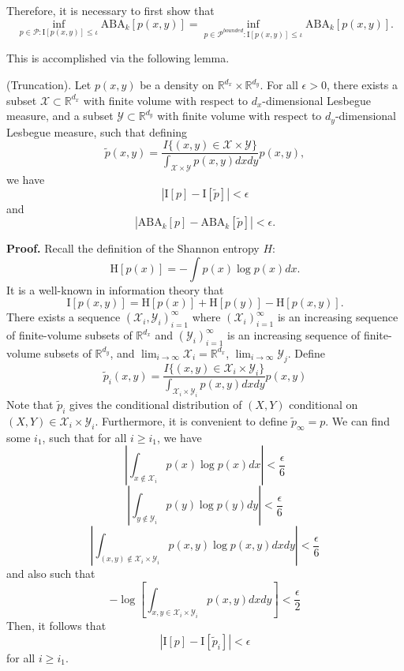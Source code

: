 \documentclass[12pt]{article}
\begin{document}
Therefore, it is necessary to first show that
\[
\inf_{p \in \mathcal{P}: \text{I}[p(x,y)] \leq \iota} \text{ABA}_k[p(x,y)] = 
\inf_{p \in \mathcal{P}^{bounded}: \text{I}[p(x,y)] \leq \iota} \text{ABA}_k[p(x,y)].
\]

This is accomplished via the following lemma.

\begin{lemma}\label{lemma:truncation} (Truncation).
Let $p(x, y)$ be a density on
$\mathbb{R}^{d_x} \times \mathbb{R}^{d_y}$.  For all $\epsilon > 0$,
there exists a subset $\mathcal{X} \subset \mathbb{R}^{d_x}$ with
finite volume with respect to $d_x$-dimensional Lesbegue measure, and
a subset $\mathcal{Y} \subset \mathbb{R}^{d_y}$ with finite volume
with respect to $d_y$-dimensional Lesbegue measure, such that defining
\[
\tilde{p}(x, y) = \frac{I\{(x,y) \in \mathcal{X}\times \mathcal{Y}\} }{\int_{\mathcal{X} \times \mathcal{Y}} p(x,y) dx dy} p(x,y),
\]
we have
\[
|\text{I}[p] - \text{I}[\tilde{p}]| < \epsilon
\]
and
\[
|\text{ABA}_k[p] - \text{ABA}_k[\tilde{p}]| < \epsilon.
\]
\end{lemma}

\textbf{Proof.}
Recall the definition of the Shannon entropy $H$:
\[
\text{H}[p(x)] = - \int p(x) \log p(x) dx.
\]
It is a well-known in information theory that
\[
\text{I}[p(x, y)] = \text{H}[p(x)] + \text{H}[p(y)] - \text{H}[p(x, y)].
\]
There exists a sequence $(\mathcal{X}_i, \mathcal{Y}_i)_{i=1}^\infty$
where $(\mathcal{X}_i)_{i=1}^\infty$ is an increasing sequence of finite-volume subsets of $\mathbb{R}^{d_x}$
and $(\mathcal{Y}_i)_{i=1}^\infty$ is an increasing sequence of finite-volume subsets of $\mathbb{R}^{d_y}$,
and $\lim_{i \to \infty} \mathcal{X}_i = \mathbb{R}^{d_x}$, $\lim_{i \to \infty} \mathcal{Y}_j$.
Define
\[
\tilde{p}_i(x, y) = \frac{I\{(x,y) \in \mathcal{X}_i\times \mathcal{Y}_i\} }{\int_{\mathcal{X}_i \times \mathcal{Y}_i} p(x,y) dx dy} p(x,y)
\]
Note that $\tilde{p}_i$ gives the conditional distribution of $(X, Y)$
conditional on $(X, Y) \in \mathcal{X}_i \times \mathcal{Y}_i$. 
Furthermore, it is convenient to define $\tilde{p}_\infty = p$.
We can find some $i_1$, such that for all $i \geq i_1$, we have
\[
\left|\int_{x \notin \mathcal{X}_i} p(x) \log p(x) dx\right| < \frac{\epsilon}{6}
\]
\[
\left|\int_{y \notin \mathcal{Y}_i} p(y) \log p(y) dy\right| < \frac{\epsilon}{6}
\]
\[
\left|\int_{(x,y) \notin \mathcal{X}_i \times \mathcal{Y}_i} p(x, y) \log p(x, y) dx dy\right| < \frac{\epsilon}{6}
\]
and also such that
\[
-\log \left[\int_{x, y \in \mathcal{X}_i \times \mathcal{Y}_i} p(x, y) dx dy\right] < \frac{\epsilon}{2}
\]
Then, it follows that
\[
|\text{I}[p] - \text{I}[\tilde{p}_i]| < \epsilon
\]
for all $i \geq i_1$.
\end{document}
